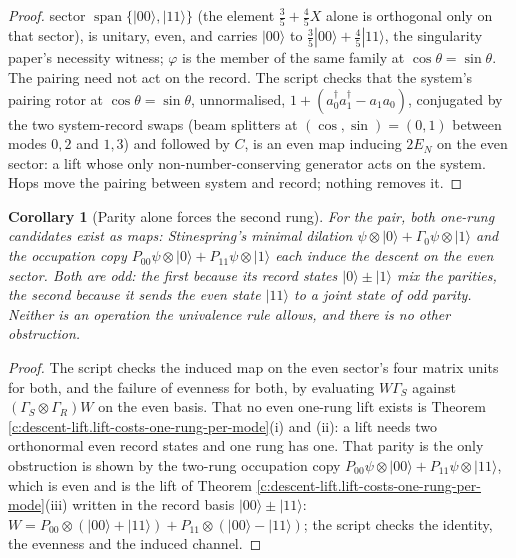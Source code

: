 \documentclass[11pt]{article}
\newtheorem{corollary}[theorem]{Corollary}
\theoremstyle{definition}
\theoremstyle{plain}
\providecommand{\EN}{}\renewcommand{\EN}{E_{N}}
\providecommand{\G}{}\renewcommand{\G}{\Gamma}
\providecommand{\ket}{}\renewcommand{\ket}[1]{|#1\rangle}
\begin{document}
\begin{proof}
sector $\operatorname{span}\{\ket{00}, \ket{11}\}$ (the element $\tfrac35 + \tfrac45 X$ alone is orthogonal only on that sector), is unitary, even, and carries $\ket{00}$ to $\tfrac35\ket{00} + \tfrac45\ket{11}$, the singularity paper's necessity witness; $\varphi$ is the member of the same family at $\cos\theta = \sin\theta$. The pairing need not act on the record. The script checks that the system's pairing rotor at $\cos\theta = \sin\theta$, unnormalised, $1 + (a^{\dagger}_{0}a^{\dagger}_{1} - a_{1}a_{0})$, conjugated by the two system-record swaps (beam splitters at $(\cos, \sin) = (0, 1)$ between modes $0, 2$ and $1, 3$) and followed by $C$, is an even map inducing $2\EN$ on the even sector: a lift whose only non-number-conserving generator acts on the system. Hops move the pairing between system and record; nothing removes it.

\end{proof}

\begin{corollary}[Parity alone forces the second rung]\label{c:descent-lift.parity-alone-forces-second-rung}
For the pair, both one-rung candidates exist as maps: Stinespring's minimal dilation $\psi \otimes \ket{0} + \G_{0}\psi \otimes \ket{1}$ and the occupation copy $P_{00}\psi \otimes \ket{0} + P_{11}\psi \otimes \ket{1}$ each induce the descent on the even sector. Both are odd: the first because its record states $\ket{0} \pm \ket{1}$ mix the parities, the second because it sends the even state $\ket{11}$ to a joint state of odd parity. Neither is an operation the univalence rule allows, and there is no other obstruction.
\end{corollary}
\begin{proof}
The script checks the induced map on the even sector's four matrix units for both, and the failure of evenness for both, by evaluating $W\G_{S}$ against $(\G_{S}\otimes\G_{R})W$ on the even basis. That no even one-rung lift exists is Theorem \ref{c:descent-lift.lift-costs-one-rung-per-mode}(i) and (ii): a lift needs two orthonormal even record states and one rung has one. That parity is the only obstruction is shown by the two-rung occupation copy $P_{00}\psi \otimes \ket{00} + P_{11}\psi \otimes \ket{11}$, which is even and is the lift of Theorem \ref{c:descent-lift.lift-costs-one-rung-per-mode}(iii) written in the record basis $\ket{00} \pm \ket{11}$: $W = P_{00} \otimes (\ket{00} + \ket{11}) + P_{11} \otimes (\ket{00} - \ket{11})$; the script checks the identity, the evenness and the induced channel.

\end{proof}
\end{document}
